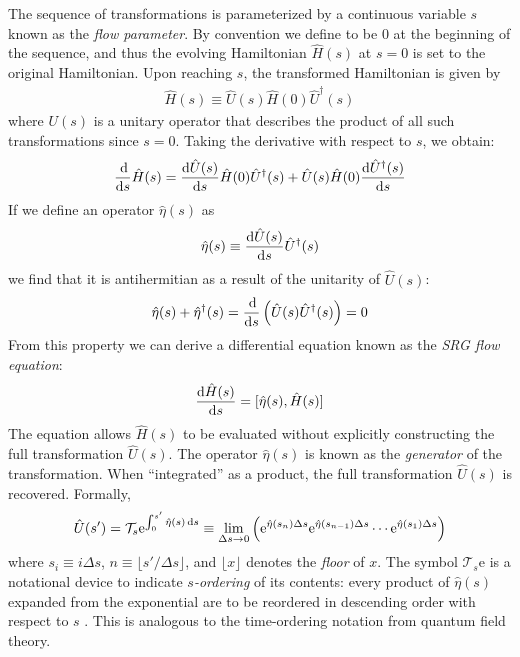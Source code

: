 The sequence of transformations is parameterized by a continuous variable $s$
known as the \textit{flow parameter}.  By convention we define to be $0$ at
the beginning of the sequence, and thus the evolving Hamiltonian $\hat H(s)$
at $s = 0$ is set to the original Hamiltonian.  Upon reaching $s$, the
transformed Hamiltonian is given by
\begin{align*}
  \hat{H}(s) \equiv \hat{U}(s) \hat{H}(0) \hat{U}^\dagger(s)
\end{align*}
where $U(s)$ is a unitary operator that describes the product of all such
transformations since $s = 0$.  Taking the derivative with respect to $s$, we obtain:
\begin{align*}
  \frac{\operatorname{d\!}}{\operatorname{d\!} s} \hat{H}(s) = \frac{\operatorname{d\!} \hat{U}(s)}{\operatorname{d\!} s} \hat{H}(0) \hat{U}^\dagger(s) + \hat{U}(s) \hat{H}(0) \frac{\operatorname{d\!} \hat{U}^\dagger (s)}{\operatorname{d\!} s}
\end{align*}
If we define an operator $\hat{\eta}(s)$ as
\begin{align*}
  \hat{\eta}(s) \equiv \frac{\operatorname{d\!} \hat{U}(s)}{\operatorname{d\!} s} \hat{U}^\dagger(s)
\end{align*}
we find that it is antihermitian as a result of the unitarity of $\hat{U}(s)$:
\begin{align*}
  \hat{\eta}(s) + \hat{\eta}^\dagger(s)
  = \frac{\operatorname{d\!}}{\operatorname{d\!} s} \left(\hat{U}(s) \hat{U}^\dagger(s)\right)
  = 0
\end{align*}
From this property we can derive a differential equation known as the
\textit{SRG flow equation}:
\begin{align} \label{eq:imsrgode}
  \frac{\operatorname{d\!} \hat{H}(s)}{\operatorname{d\!} s} = [\hat{\eta}(s), \hat{H}(s)]
\end{align}
The equation allows $\hat{H}(s)$ to be evaluated without explicitly
constructing the full transformation $\hat U(s)$.  The operator $\hat \eta(s)$
is known as the \textit{generator} of the transformation.  When ``integrated''
as a product, the full transformation $\hat U(s)$ is recovered.  Formally,
\begin{align*}
  \hat U(s')
  = \mathcal{T}_s \mathrm{e}^{\int_0^{s'} \hat{\eta}(s) \operatorname{d\!} s}
  \equiv \lim_{\Delta s \to 0}\left(\mathrm{e}^{\hat{\eta}(s_n) \Delta s} \mathrm{e}^{\hat{\eta}(s_{n - 1}) \Delta s} \cdots \mathrm{e}^{\hat{\eta}(s_1) \Delta s}\right)
\end{align*}
where $s_i \equiv i \Delta s$, $n \equiv \lfloor s' / \Delta s \rfloor$, and $\lfloor x \rfloor$ denotes the \textit{floor} of $x$.  The symbol $\mathcal{T}_s \mathrm{e}$ is a notational device to indicate \textit{$s$-ordering} of its contents: every product of $\hat{\eta}(s)$ expanded from the exponential are to be reordered in descending order with respect to $s$ \cite[\S 6.1]{reimann2013quantum}.  This is analogous to the time-ordering notation from quantum field theory.

